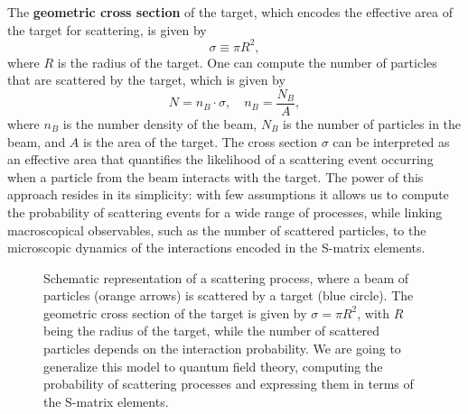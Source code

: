 The \textbf{geometric cross section} of the target, which encodes the effective area of the target for scattering, is given by
\begin{equation}
    \sigma \equiv \pi R^2,
    \label{eq:geometric_cross_section}
\end{equation}
where $R$ is the radius of the target. One can compute the number of particles that are scattered by the target, which is given by
\[
    N = n_B \cdot \sigma, \quad n_B = \frac{N_B}{A},
\]
where $n_B$ is the number density of the beam, $N_B$ is the number of particles in the beam, and $A$ is the area of the target. The cross section $\sigma$ can be interpreted as an effective area that quantifies the likelihood of a scattering event occurring when a particle from the beam interacts with the target. The power of this approach resides in its simplicity: with few assumptions it allows us to compute the probability of scattering events for a wide range of processes, while linking macroscopical observables, such as the number of scattered particles, to the microscopic dynamics of the interactions encoded in the S-matrix elements.
\begin{figure}[H]
    \begin{minipage}{0.3\textwidth}
        \centering
    \end{minipage}
    \hfill
    \begin{minipage}{0.65\textwidth}
        \caption{Schematic representation of a scattering process, where a beam of particles (orange arrows) is scattered by a target (blue circle). The geometric cross section of the target is given by \(\sigma = \pi R^2\), with \(R\) being the radius of the target, while the number of scattered particles depends on the interaction probability. We are going to generalize this model to quantum field theory, computing the probability of scattering processes and expressing them in terms of the S-matrix elements.}
    \end{minipage}
\end{figure}
